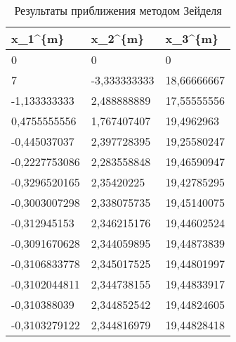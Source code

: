 \documentclass[10pt, a4paper, titlepage]{article}
\begin{document}
\begin{table}[htb]
    \centering
    \begin{tabular}{|*{3}{L|}}
        \hline
        x_1^{\{m\}} & x_2^{\{m\}} & x_3^{\{m\}} \\ \hline
        
        \phantom{+}0 & \phantom{+}0 & \phantom{0}0 \\ \hline
        
        \phantom{+}7 & -3,333333333 & 18,66666667 \\ \hline
        
        -1,133333333 & \phantom{+}2,488888889 & 17,55555556 \\ \hline
        
        \phantom{+}0,4755555556 & \phantom{+}1,767407407 & 19,4962963 \\ \hline
        
        -0,445037037 & \phantom{+}2,397728395 & 19,25580247 \\ \hline
        
        -0,2227753086 & \phantom{+}2,283558848 & 19,46590947 \\ \hline
        
        -0,3296520165 & \phantom{+}2,35420225 & 19,42785295 \\ \hline
        
        -0,3003007298 & \phantom{+}2,338075735 & 19,45140075 \\ \hline
        
        -0,312945153 & \phantom{+}2,346215176 & 19,44602524 \\ \hline
        
        -0,3091670628 & \phantom{+}2,344059895 & 19,44873839 \\ \hline
        
        -0,3106833778 & \phantom{+}2,345017525 & 19,44801997 \\ \hline
        
        -0,3102044811 & \phantom{+}2,344738155 & 19,44833917 \\ \hline
        
        -0,310388039 & \phantom{+}2,344852542 & 19,44824605 \\ \hline
        
        -0,3103279122 & \phantom{+}2,344816979 & 19,44828418 \\ \hline
        
    \end{tabular}
    \caption{Результаты приближения методом Зейделя}
    \label{sr1Task3Table}
\end{table}
\end{document}
